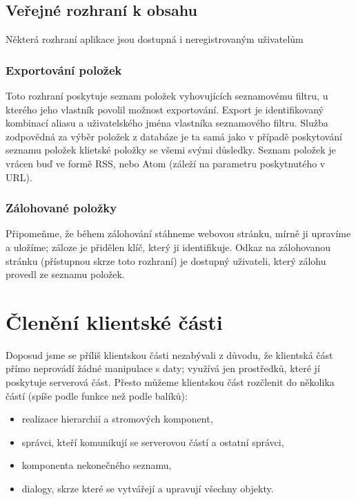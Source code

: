\subsection{Veřejné rozhraní k obsahu}

Některá rozhraní aplikace jsou dostupná i neregistrovaným uživatelům

\subsubsection{Exportování položek}

Toto rozhraní poskytuje seznam položek vyhovujících seznamovému filtru, u kterého jeho vlastník povolil možnost exportování.
Export je identifikovaný kombinací aliasu a uživatelského jména vlastníka seznamového filtru.
Služba zodpovědná za výběr položek z databáze je ta samá jako v případě poskytování seznamu položek klietské položky se všemi svými důsledky.
Seznam položek je vrácen buď ve formě RSS, nebo Atom (záleží na parametru poskytnutého v URL).

\subsubsection{Zálohované položky}

Připomeňme, že během zálohování stáhneme webovou stránku, mírně ji upravíme a uložíme; záloze je přidělen klíč, který ji identifikuje.
Odkaz na zálohovanou stránku (přístupnou skrze toto rozhraní) je dostupný uživateli, který zálohu provedl ze seznamu položek.

\section{Členění klientské části}

Doposud jsme se příliš klientskou části nezabývali z důvodu, že klientská část přímo neprovádí žádné manipulace s daty; využívá jen prostředků, které jí poskytuje serverová část.
Přesto můžeme klientskou část rozčlenit do několika částí (spíše podle funkce než podle balíků):
\begin{itemize}
	\item realizace hierarchií a stromových komponent,
	\item správci, kteří komunikují se serverovou částí a ostatní správci,
	\item komponenta nekonečného seznamu,
	\item dialogy, skrze které se vytvářejí a upravují všechny objekty.
\end{itemize}


